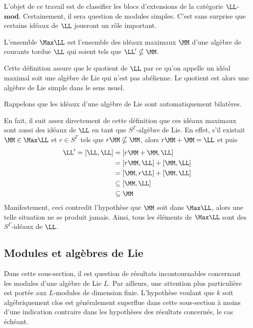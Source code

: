 L'objet de ce travail est de classifier les blocs d'extensions de la catégorie $\LL$-$\mathbf{mod}$. Certainement, il sera question de modules simples. C'est sans surprise que certains idéaux de $\LL$ joueront un rôle important.

\begin{Def} \label{maxl} L'ensemble $\Max \LL$ est l'ensemble des idéaux maximaux $\MM$ d'une algèbre de courants tordue $\LL$  qui soient tels que $\LL' \nsubseteq \MM$. 
\end{Def}

\begin{Rem} Cette définition assure que le quotient de $\LL$ par ce qu'on appelle un idéal maximal soit une algèbre de Lie qui n'est pas abélienne. Le quotient est alors une algèbre de Lie simple dans le sens usuel.

Rappelons que les idéaux d'une algèbre de Lie sont automatiquement bilatères.
\end{Rem}

En fait, il suit assez directement de cette définition que ces idéaux maximaux sont aussi des idéaux de $\LL$ en tant que $S^\Gamma$-algèbre de Lie. En effet, s'il existait $\MM \in \Max \LL$ et $r \in S^\Gamma$ tels que $r\MM \nsubseteq \MM$, alors $r\MM + \MM = \LL$ et puis
\begin{align*}
\LL' = [\LL,\LL] &= [r\MM + \MM, \LL] \\
&= [r\MM, \LL] + [\MM, \LL] \\
&= [\MM, r\LL] + [\MM, \LL] \\
&\subseteq [\MM, \LL] \\
&\subseteq \MM
\end{align*}
Manifestement, ceci contredit l'hypothèse que $\MM$ soit dans $\Max \LL$, alors une telle situation ne se produit jamais. Ainsi, tous les éléments de $\Max \LL$ sont des $S^\Gamma$-idéaux de $\LL$.


%
\subsection{Modules et algèbres de Lie}

Dans cette sous-section, il est question de résultats incontournables concernant les modules d'une algèbre de Lie $L$. Par ailleurs, une attention plus particulière est portée aux $L$-modules de dimension finie. L'hypothèse voulant que $k$ soit algébriquement clos est généralement superflue dans cette sous-section à moins d'une indication contraire dans les hypothèses des résultats concernés, le cas échéant. 


